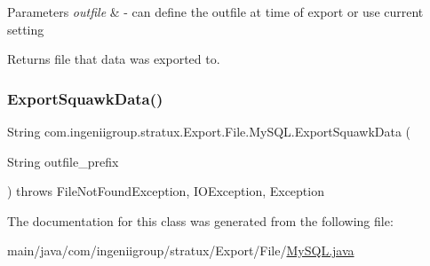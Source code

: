 \begin{DoxyParams}{Parameters}
{\em outfile} & -\/ can define the outfile at time of export or use current setting\\
\hline
\end{DoxyParams}
\begin{DoxyReturn}{Returns}
file that data was exported to. 
\end{DoxyReturn}
\mbox{\label{classcom_1_1ingeniigroup_1_1stratux_1_1_export_1_1_file_1_1_my_s_q_l_a9f988f5e57616c8c6adc6ab4fd231c68}} 
\subsubsection{\texorpdfstring{Export\+Squawk\+Data()}{ExportSquawkData()}\hspace{0.1cm}{\footnotesize\ttfamily [2/2]}}
{\footnotesize\ttfamily String com.\+ingeniigroup.\+stratux.\+Export.\+File.\+My\+S\+Q\+L.\+Export\+Squawk\+Data (\begin{DoxyParamCaption}\item[{String}]{outfile\+\_\+prefix }\end{DoxyParamCaption}) throws File\+Not\+Found\+Exception, I\+O\+Exception, Exception}



The documentation for this class was generated from the following file\+:\begin{DoxyCompactItemize}
\item 
main/java/com/ingeniigroup/stratux/\+Export/\+File/\hyperlink{_my_s_q_l_8java}{My\+S\+Q\+L.\+java}\end{DoxyCompactItemize}
